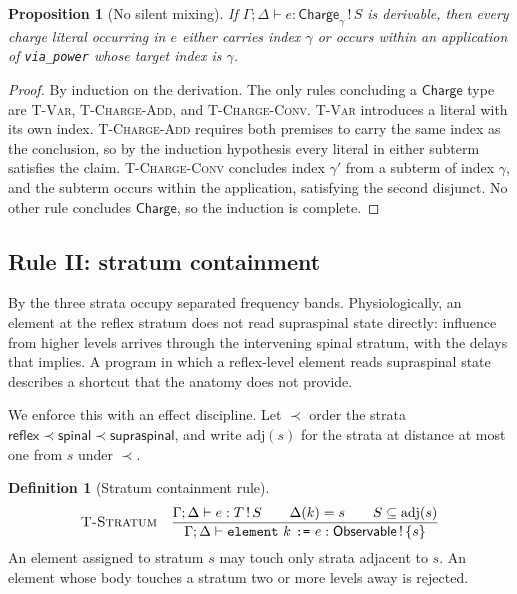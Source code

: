 \documentclass[11pt,twocolumn,a4paper]{article}
\theoremstyle{thmstyle}
\newtheorem{proposition}[theorem]{Proposition}
\theoremstyle{definition}
\newtheorem{definition}[theorem]{Definition}
\theoremstyle{remark}
\newcommand{\Env}{\Gamma}
\newcommand{\Chg}{\textsf{Charge}}
\newcommand{\Obs}{\textsf{Observable}}
\begin{document}
\begin{proposition}[No silent mixing]
\label{prop:no-mixing}
If $\Env;\Delta\vdash e:\Chg_{\gamma}\,!\,S$ is derivable, then every charge
literal occurring in $e$ either carries index $\gamma$ or occurs within an
application of \texttt{via\_power} whose target index is $\gamma$.
\end{proposition}

\begin{proof}
By induction on the derivation. The only rules concluding a $\Chg{}$ type are
\textsc{T-Var}, \textsc{T-Charge-Add}, and \textsc{T-Charge-Conv}.
\textsc{T-Var} introduces a literal with its own index. \textsc{T-Charge-Add}
requires both premises to carry the same index as the conclusion, so by the
induction hypothesis every literal in either subterm satisfies the claim.
\textsc{T-Charge-Conv} concludes index $\gamma'$ from a subterm of index
$\gamma$, and the subterm occurs within the application, satisfying the second
disjunct. No other rule concludes $\Chg{}$, so the induction is complete.
\end{proof}

\subsection{Rule II: stratum containment}
\label{sec:strata}

By  the three strata occupy separated frequency bands.
Physiologically, an element at the reflex stratum does not read supraspinal
state directly: influence from higher levels arrives through the intervening
spinal stratum, with the delays that implies. A program in which a reflex-level
element reads supraspinal state describes a shortcut that the anatomy does not
provide.

We enforce this with an effect discipline. Let $\prec$ order the strata
$\textsf{reflex}\prec\textsf{spinal}\prec\textsf{supraspinal}$, and write
$\mathrm{adj}(s)$ for the strata at distance at most one from $s$ under
$\prec$.

\begin{definition}[Stratum containment rule]
\label{def:stratum-rule}
\[
\textsc{T-Stratum}\quad
\frac{\Env;\Delta\vdash e:T\,!\,S\qquad
      \Delta(k)=s\qquad S\subseteq\mathrm{adj}(s)}
     {\Env;\Delta\vdash \texttt{element}\ k\ \texttt{:=}\ e:\Obs\,!\,\{s\}}
\]
An element assigned to stratum $s$ may touch only strata adjacent to $s$. An
element whose body touches a stratum two or more levels away is rejected.
\end{definition}
\end{document}
